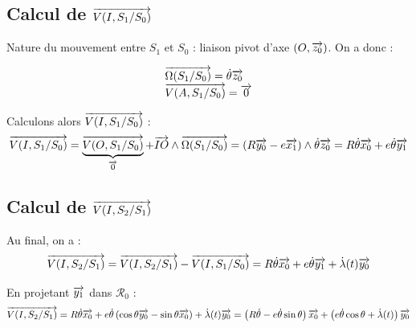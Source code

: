 \documentclass[10pt,oneside]{article}
\begin{document}
\subsection*{Calcul de $\overrightarrow{V(I,S_1/S_0)}$}
Nature du mouvement entre $S_1$ et $S_0$ : liaison pivot d'axe $(O,\overrightarrow{z_0})$.
On a donc : 

$$
\begin{array}{l}
\overrightarrow{\Omega(S_1/S_0)} = \dot{\theta}\overrightarrow{z_0} \\
\overrightarrow{V(A,S_1/S_0)} = \overrightarrow{0} \\
\end{array}
$$

Calculons alors $\overrightarrow{V(I,S_1/S_0)}$ :
$$
\overrightarrow{V(I,S_1/S_0)} 
= \underbrace{\overrightarrow{V(O,S_1/S_0)}}_{\overrightarrow{0} }
+ \overrightarrow{IO} \wedge \overrightarrow{\Omega(S_1/S_0)} = \left(R\overrightarrow{y_0}-e\overrightarrow{x_1}\right) \wedge \dot{\theta}\overrightarrow{z_0}
= R\dot{\theta}\overrightarrow{x_0} + e\dot{\theta}\overrightarrow{y_1}
$$

%

\subsection*{Calcul de $\overrightarrow{V(I,S_2/S_1)}$}

Au final, on a :
$$
\overrightarrow{V(I,S_2/S_1)} = \overrightarrow{V(I,S_2/S_1)} - \overrightarrow{V(I,S_1/S_0)}
= R\dot{\theta}\overrightarrow{x_0} + e\dot{\theta}\overrightarrow{y_1} +\dot{\lambda}(t) \overrightarrow{y_0}
$$

En projetant $\overrightarrow{y_1}$ dans $\mathcal{R}_0$ : 
$$
\overrightarrow{V(I,S_2/S_1)} 
= R\dot{\theta}\overrightarrow{x_0} + e\dot{\theta}\left( \cos\theta \overrightarrow{y_0} - \sin\theta \overrightarrow{x_0} \right)+\dot{\lambda}(t) \overrightarrow{y_0} 
= \left(R\dot{\theta} - e\dot{\theta}\sin\theta \right) \overrightarrow{x_0} + \left(e\dot{\theta} \cos\theta +\dot{\lambda}(t) \right) \overrightarrow{y_0}
$$
\end{document}
